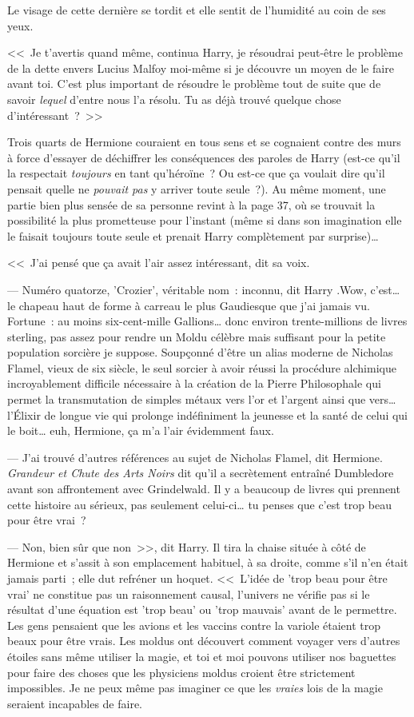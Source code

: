 Le visage de cette dernière se tordit et elle sentit de l'humidité au coin de ses yeux.

<<~Je t'avertis quand même, continua Harry, je résoudrai peut-être le problème de la dette envers Lucius Malfoy moi-même si je découvre un moyen de le faire avant toi. C'est plus important de résoudre le problème tout de suite que de savoir \emph{lequel} d'entre nous l'a résolu. Tu as déjà trouvé quelque chose d'intéressant~?~>>

Trois quarts de Hermione couraient en tous sens et se cognaient contre des murs à force d'essayer de déchiffrer les conséquences des paroles de Harry (est-ce qu'il la respectait \emph{toujours} en tant qu'héroïne~? Ou est-ce que ça voulait dire qu'il pensait quelle ne \emph{pouvait pas} y arriver toute seule~?). Au même moment, une partie bien plus sensée de sa personne revint à la page 37, où se trouvait la possibilité la plus prometteuse pour l'instant (même si dans son imagination elle le faisait toujours toute seule et prenait Harry complètement par surprise)…

<<~J'ai pensé que ça avait l'air assez intéressant, dit sa voix.

--- Numéro quatorze, 'Crozier', véritable nom~: inconnu, dit Harry .Wow, c'est… le chapeau haut de forme à carreau le plus Gaudiesque que j'ai jamais vu. Fortune~: au moins six-cent-mille Gallions… donc environ trente-millions de livres sterling, pas assez pour rendre un Moldu célèbre mais suffisant pour la petite population sorcière je suppose. Soupçonné d'être un alias moderne de Nicholas Flamel, vieux de six siècle, le seul sorcier à avoir réussi la procédure alchimique incroyablement difficile nécessaire à la création de la Pierre Philosophale qui permet la transmutation de simples métaux vers l'or et l'argent ainsi que vers… l'Élixir de longue vie qui prolonge indéfiniment la jeunesse et la santé de celui qui le boit… euh, Hermione, ça m'a l'air évidemment faux.

--- J'ai trouvé d'autres références au sujet de Nicholas Flamel, dit Hermione. \emph{Grandeur et Chute des Arts Noirs} dit qu'il a secrètement entraîné Dumbledore avant son affrontement avec Grindelwald. Il y a beaucoup de livres qui prennent cette histoire au sérieux, pas seulement celui-ci… tu penses que c'est trop beau pour être vrai~?

--- Non, bien sûr que non~>>, dit Harry. Il tira la chaise située à côté de Hermione et s'assit à son emplacement habituel, à sa droite, comme s'il n'en était jamais parti~; elle dut refréner un hoquet. <<~L'idée de 'trop beau pour être vrai' ne constitue pas un raisonnement causal, l'univers ne vérifie pas si le résultat d'une équation est 'trop beau' ou 'trop mauvais' avant de le permettre. Les gens pensaient que les avions et les vaccins contre la variole étaient trop beaux pour être vrais. Les moldus ont découvert comment voyager vers d'autres étoiles sans même utiliser la magie, et toi et moi pouvons utiliser nos baguettes pour faire des choses que les physiciens moldus croient être strictement impossibles. Je ne peux même pas imaginer ce que les \emph{vraies} lois de la magie seraient incapables de faire.

